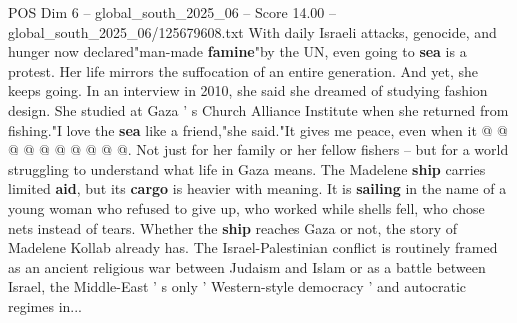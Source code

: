 \begin{textsample}{POS Dim 6 – global\_south\_2025\_06 – Score 14.00 – global\_south\_2025\_06/125679608.txt}
With daily Israeli attacks, genocide, and hunger now declared"man-made \textbf{famine}"by the UN, even going to \textbf{sea} is a protest.
Her life mirrors the suffocation of an entire generation.
And yet, she keeps going.
In an interview in 2010, she said she dreamed of studying fashion design.
She studied at Gaza ' s Church Alliance Institute when she returned from fishing."I love the \textbf{sea} like a friend,"she said."It gives me peace, even when it @ @ @ @ @ @ @ @ @ @.
Not just for her family or her fellow fishers -- but for a world struggling to understand what life in Gaza means.
The Madelene \textbf{ship} carries limited \textbf{aid}, but its \textbf{cargo} is heavier with meaning.
It is \textbf{sailing} in the name of a young woman who refused to give up, who worked while shells fell, who chose nets instead of tears.
Whether the \textbf{ship} reaches Gaza or not, the story of Madelene Kollab already has.
The Israel-Palestinian conflict is routinely framed as an ancient religious war between Judaism and Islam or as a battle between Israel, the Middle-East ' s only ' Western-style democracy ' and autocratic regimes in...

\end{textsample}
